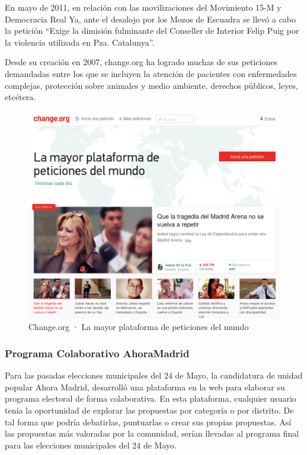 En mayo de 2011, en relación con las movilizaciones del Movimiento 15-M y Democracia Real Ya, ante el desalojo por los Mozos de Escuadra se llevó a cabo la petición “Exige la dimisión fulminante del Conseller de Interior Felip Puig por la violencia utilizada en Pza. Catalunya”.

Desde su creación en 2007, change.org ha logrado muchas de sus peticiones demandadas entre los que se incluyen la atención de pacientes con enfermedades complejas, protección sobre animales y medio ambiente, derechos públicos, leyes, etcétera.

\begin{figure}[H]
\centering
\includegraphics[keepaspectratio, scale=0.35]{Media/Captures/changeOrg.png}
\caption{Change.org · La mayor plataforma de peticiones del mundo}
\label{fig:changeOrg}
\end{figure}

\subsubsection{Programa Colaborativo AhoraMadrid}

Para las pasadas elecciones municipales del 24 de Mayo, la candidatura de unidad popular Ahora Madrid, desarrolló una plataforma en la web para elaborar su programa electoral de forma colaborativa. En esta plataforma, cualquier usuario tenía la oportunidad de explorar las propuestas por categoría o por distrito. De tal forma que podría debatirlas, puntuarlas o crear sus propias propuestas. Así las propuestas más valoradas por la comunidad, serían llevadas al programa final para las elecciones municipales del 24 de Mayo.

